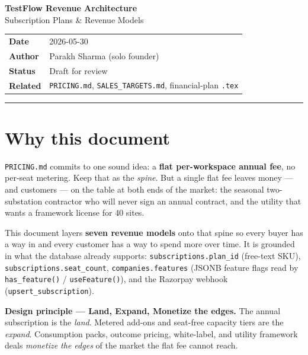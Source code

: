 \documentclass[11pt,a4paper]{article}
\begin{document}

\begin{center}
  {\LARGE\bfseries TestFlow Revenue Architecture}\\[0.4em]
  {\large\color{accent} Subscription Plans \& Revenue Models}\\[1.2em]
  \begin{tabular}{ll}
    \textbf{Date}    & 2026-05-30 \\
    \textbf{Author}  & Parakh Sharma (solo founder) \\
    \textbf{Status}  & Draft for review \\
    \textbf{Related} & \texttt{PRICING.md}, \texttt{SALES\_TARGETS.md}, financial-plan \texttt{.tex} \\
  \end{tabular}
\end{center}
\vspace{0.8em}
\hrule
\vspace{1.2em}

\section{Why this document}

\texttt{PRICING.md} commits to one sound idea: a \textbf{flat per-workspace annual
fee}, no per-seat metering. Keep that as the \emph{spine}. But a single flat fee
leaves money --- and customers --- on the table at both ends of the market: the
seasonal two-substation contractor who will never sign an annual contract, and
the utility that wants a framework license for 40 sites.

This document layers \textbf{seven revenue models} onto that spine so every buyer
has a way in and every customer has a way to spend more over time. It is grounded
in what the database already supports: \texttt{subscriptions.plan\_id} (free-text
SKU), \texttt{subscriptions.seat\_count}, \texttt{companies.features} (JSONB
feature flags read by \texttt{has\_feature()} / \texttt{useFeature()}), and the
Razorpay webhook (\texttt{upsert\_subscription}).

\begin{keybox}
\textbf{Design principle --- Land, Expand, Monetize the edges.}
The annual subscription is the \emph{land}. Metered add-ons and seat-free
capacity tiers are the \emph{expand}. Consumption packs, outcome pricing,
white-label, and utility framework deals \emph{monetize the edges} of the market
the flat fee cannot reach.
\end{keybox}
\end{document}
